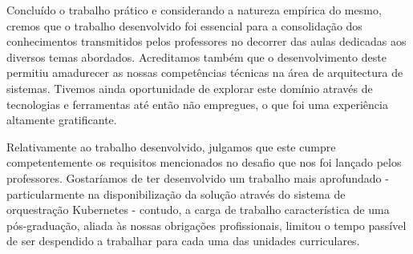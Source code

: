 Concluído o trabalho prático e considerando a natureza empírica do mesmo, cremos que o trabalho desenvolvido foi essencial para a consolidação dos conhecimentos transmitidos pelos professores no decorrer das aulas dedicadas aos diversos temas abordados. Acreditamos também que o desenvolvimento deste permitiu amadurecer as nossas competências técnicas na área de arquitectura de sistemas. Tivemos ainda oportunidade de explorar este domínio através de tecnologias e ferramentas até então não empregues, o que foi uma experiência altamente gratificante.

Relativamente ao trabalho desenvolvido, julgamos que este cumpre competentemente os requisitos mencionados no desafio que nos foi lançado pelos professores. Gostaríamos de ter desenvolvido um trabalho mais aprofundado - particularmente na disponibilização da solução através do sistema de orquestração Kubernetes - contudo, a carga de trabalho característica de uma pós-graduação, aliada às nossas obrigações profissionais, limitou o tempo passível de ser despendido a trabalhar para cada uma das unidades curriculares.